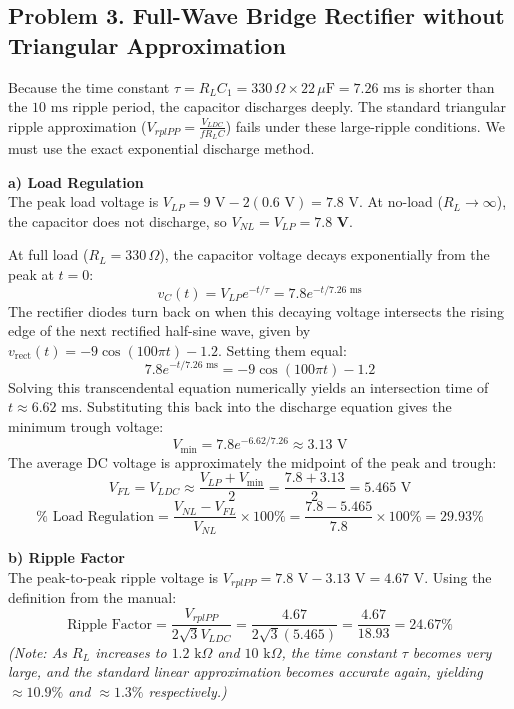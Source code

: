 
\subsection*{Problem 3. Full-Wave Bridge Rectifier without Triangular Approximation}

Because the time constant $\tau = R_L C_1 = 330\,\Omega \times 22\,\mu\text{F} = 7.26\text{ ms}$ is shorter than the $10\text{ ms}$ ripple period, the capacitor discharges deeply. The standard triangular ripple approximation ($V_{rplPP} = \frac{V_{LDC}}{f R_L C}$) fails under these large-ripple conditions. We must use the exact exponential discharge method.

\textbf{a) Load Regulation} \\
The peak load voltage is $V_{LP} = 9\text{ V} - 2(0.6\text{ V}) = 7.8\text{ V}$. At no-load ($R_L \to \infty$), the capacitor does not discharge, so $V_{NL} = V_{LP} = \mathbf{7.8\text{ V}}$. 

At full load ($R_L = 330\,\Omega$), the capacitor voltage decays exponentially from the peak at $t=0$:
\begin{equation*}
    v_C(t) = V_{LP} e^{-t/\tau} = 7.8 e^{-t/7.26\text{ ms}}
\end{equation*}
The rectifier diodes turn back on when this decaying voltage intersects the rising edge of the next rectified half-sine wave, given by $v_{\text{rect}}(t) = -9\cos(100\pi t) - 1.2$. Setting them equal:
\begin{equation*}
    7.8 e^{-t/7.26\text{ ms}} = -9\cos(100\pi t) - 1.2
\end{equation*}
Solving this transcendental equation numerically yields an intersection time of $t \approx 6.62\text{ ms}$. Substituting this back into the discharge equation gives the minimum trough voltage:
\begin{equation*}
    V_{\text{min}} = 7.8 e^{-6.62/7.26} \approx 3.13\text{ V}
\end{equation*}
The average DC voltage is approximately the midpoint of the peak and trough:
\begin{equation*}
    V_{FL} = V_{LDC} \approx \frac{V_{LP} + V_{\text{min}}}{2} = \frac{7.8 + 3.13}{2} = 5.465\text{ V}
\end{equation*}
\begin{equation*}
    \%\text{ Load Regulation} = \frac{V_{NL} - V_{FL}}{V_{NL}} \times 100\% = \frac{7.8 - 5.465}{7.8} \times 100\% = \mathbf{29.93\%}
\end{equation*}

\textbf{b) Ripple Factor} \\
The peak-to-peak ripple voltage is $V_{rplPP} = 7.8\text{ V} - 3.13\text{ V} = 4.67\text{ V}$. Using the definition from the manual:
\begin{equation*}
    \text{Ripple Factor} = \frac{V_{rplPP}}{2\sqrt{3}V_{LDC}} = \frac{4.67}{2\sqrt{3}(5.465)} = \frac{4.67}{18.93} = \mathbf{24.67\%}
\end{equation*}
\textit{(Note: As $R_L$ increases to $1.2\text{ k}\Omega$ and $10\text{ k}\Omega$, the time constant $\tau$ becomes very large, and the standard linear approximation becomes accurate again, yielding $\approx 10.9\%$ and $\approx 1.3\%$ respectively.)}

